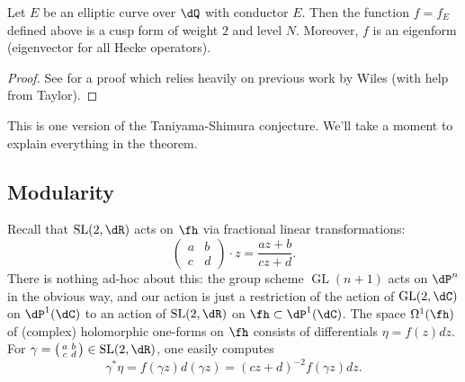 \begin{theorem}\label{thm:fermat-wiles}
Let $E$ be an elliptic curve over $\dQ$ with conductor $E$. Then the function 
$f=f_E$ defined above is a cusp form of weight $2$ and level $N$. Moreover, 
$f$ is an eigenform (eigenvector for all Hecke operators). 
\end{theorem}
\begin{proof}
See \cite{bcdt01} for a proof which relies heavily on previous work by 
Wiles (with help from Taylor).
\end{proof}
This is one version of the Taniyama-Shimura conjecture. We'll take a moment to 
explain everything in the theorem. 





\subsection{Modularity}

Recall that $\operatorname{SL}(2,\dR)$ acts 
on $\fh$ via fractional linear transformations:
\[
  \begin{pmatrix} a & b \\ c & d\end{pmatrix}\cdot z = \frac{a z+b}{c z+d} \text{.}
\]
There is nothing ad-hoc about this: the group scheme 
$\operatorname{GL}(n+1)$ acts on $\dP^n$ in the obvious way, and our action is 
just a restriction of the action of $\operatorname{GL}(2,\dC)$ on $\dP^1(\dC)$ 
to an action of $\operatorname{SL}(2,\dR)$ on $\fh\subset \dP^1(\dC)$. 
The space $\Omega^1(\fh)$ of (complex) holomorphic one-forms on $\fh$ consists of 
differentials $\eta=f(z)dz$. For 
$\gamma=\smat a b c d\in \operatorname{SL}(2,\dR)$, one easily computes 
\[
  \gamma^\ast \eta = f(\gamma z)d(\gamma z) = (c z+d)^{-2}f(\gamma z) dz \text{.}
\]

